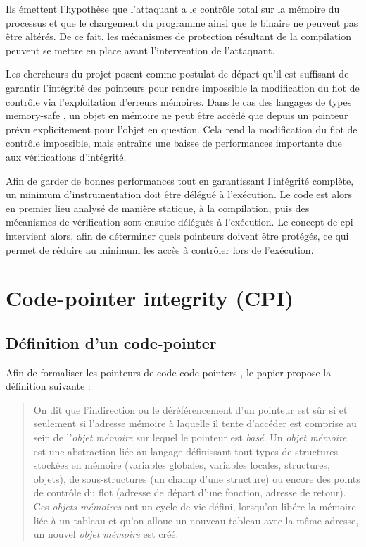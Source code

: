 Ils émettent l'hypothèse que l'attaquant a le contrôle total sur la mémoire du processus et que le chargement du programme ainsi que le binaire ne peuvent pas être altérés. De ce fait, les mécanismes de protection résultant de la compilation peuvent se mettre en place avant l'intervention de l'attaquant.

Les chercheurs du projet posent comme postulat de départ qu'il est suffisant de garantir l'intégrité des pointeurs pour rendre impossible la modification du flot de contrôle via l'exploitation d'erreurs mémoires. Dans le cas des langages de types \og memory-safe \fg, un objet en mémoire ne peut être accédé que depuis un pointeur prévu explicitement pour l'objet en question. Cela rend la modification du flot de contrôle impossible, mais entraîne une baisse de performances importante due aux vérifications d'intégrité.

Afin de garder de bonnes performances tout en garantissant l'intégrité complète, un minimum d'instrumentation doit être délégué à l'exécution. Le code est alors en premier lieu analysé de manière statique, à la compilation, puis des mécanismes de vérification sont ensuite délégués à l'exécution. Le concept de \og \gls{cpi} \fg \cite{CPIPaper} intervient alors, afin de déterminer quels pointeurs doivent être protégés, ce qui permet de réduire au minimum les accès à contrôler lors de l'exécution.


\section{\og Code-pointer integrity \fg (CPI)}

\subsection{Définition d'un \og code-pointer \fg}

Afin de formaliser les pointeurs de code \og code-pointers \fg, le papier propose la définition suivante :

\begin{quote}
	On dit que l'indirection ou le déréférencement d'un pointeur est sûr si et seulement si l'adresse mémoire à laquelle il tente d'accéder est comprise au sein de l'\textit{objet mémoire} sur lequel le pointeur est \textit{basé}. Un \textit{objet mémoire} est une abstraction liée au langage définissant tout types de structures stockées en mémoire (variables globales, variables locales, structures, objets), de sous-structures (un champ d'une structure) ou encore des points de contrôle du flot (adresse de départ d'une fonction, adresse de retour). Ces \textit{objets mémoires} ont un cycle de vie défini, lorsqu'on libére la mémoire liée à un tableau et qu'on alloue un nouveau tableau avec la même adresse, un nouvel \textit{objet mémoire} est créé.
\end{quote}

